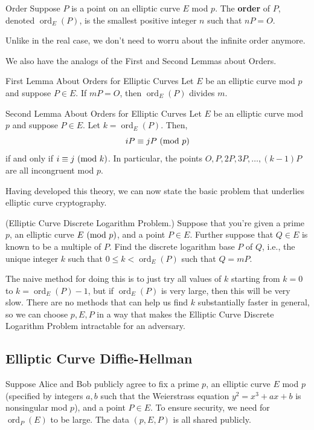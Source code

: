 \documentclass[letterpaper]{article}
\DeclareMathOperator{\ord}{ord}
\begin{document}
\begin{definition}{Order}{}
    Suppose $P$ is a point on an elliptic curve $E$ mod $p$. The \textbf{order} of $P$, denoted $\ord_{E}(P)$, is the smallest positive integer $n$ such that $nP = O$. 
\end{definition}
Unlike in the real case, we don't need to worru about the infinite order anymore. 

\bigskip 

We also have the analogs of the First and Second Lemmas about Orders. 
\begin{lemma}{First Lemma About Orders for Elliptic Curves}{}
    Let $E$ be an elliptic curve mod $p$ and suppose $P \in E$. If $mP = O$, then $\ord_{E}(P)$ divides $m$. 
\end{lemma}

\begin{lemma}{Second Lemma About Orders for Elliptic Curves}{}
    Let $E$ be an elliptic curve mod $p$ and suppose $P \in E$. Let $k = \ord_{E}(P)$. Then, \[iP \equiv jP \ (\mathrm{mod}\ p)\] if and only if $i \equiv j \ (\mathrm{mod}\ k)$. In particular, the points $O, P, 2P, 3P, \hdots, (k - 1)P$ are all incongruent mod $p$.
\end{lemma}
Having developed this theory, we can now state the basic problem that underlies elliptic curve cryptography. 
\begin{mdframed}
    (Elliptic Curve Discrete Logarithm Problem.) Suppose that you're given a prime $p$, an elliptic curve $E \ (\mathrm{mod}\ p)$, and a point $P \in E$. Further suppose that $Q \in E$ is known to be a multiple of $P$. Find the discrete logarithm base $P$ of $Q$, i.e., the unique integer $k$ such that $0 \leq k < \ord_{E}(P)$ such that $Q = mP$. 
\end{mdframed}
The naive method for doing this is to just try all values of $k$ starting from $k = 0$ to $k = \ord_{E}(P) - 1$, but if $\ord_{E}(P)$ is very large, then this will be very slow. There are no methods that can help us find $k$ substantially faster in general, so we can choose $p, E, P$ in a way that makes the Elliptic Curve Discrete Logarithm Problem intractable for an adversary. 


\subsection{Elliptic Curve Diffie-Hellman}
Suppose Alice and Bob publicly agree to fix a prime $p$, an elliptic curve $E$ mod $p$ (specified by integers $a, b$ such that the Weierstrass equation $y^2 = x^3 + ax + b$ is nonsingular mod $p$), and a point $P \in E$. To ensure security, we need for $\ord_{P}(E)$ to be large. The data $(p, E, P)$ is all shared publicly.
\end{document}
